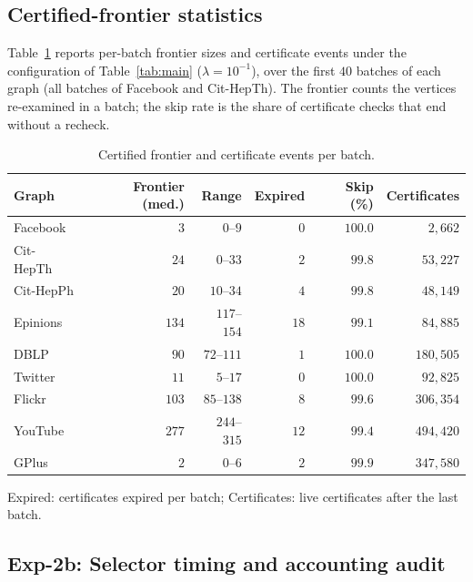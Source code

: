 \subsection{Certified-frontier statistics}
\label{app:frontier}

Table~\ref{tab:frontier} reports per-batch frontier sizes and certificate
events under the configuration of Table~\ref{tab:main} ($\lambda=10^{-1}$),
over the first $40$ batches of each graph (all batches of Facebook and
Cit-HepTh). The frontier counts the vertices re-examined in a batch; the skip
rate is the share of certificate checks that end without a recheck.

\begin{table}[tb]\centering
\caption{Certified frontier and certificate events per batch.}
\label{tab:frontier}
\begin{footnotesize}
\setlength{\tabcolsep}{0.3em}
\begin{tabular*}{\linewidth}{@{\extracolsep{\fill}}lrrrrr@{}}
\toprule
Graph & Frontier (med.) & Range & Expired & Skip (\%) & Certificates \\
\midrule
Facebook  & $3$   & $0$--$9$     & $0$  & $100.0$ & $2{,}662$ \\
Cit-HepTh & $24$  & $0$--$33$    & $2$  & $99.8$  & $53{,}227$ \\
Cit-HepPh & $20$  & $10$--$34$   & $4$  & $99.8$  & $48{,}149$ \\
Epinions  & $134$ & $117$--$154$ & $18$ & $99.1$  & $84{,}885$ \\
DBLP      & $90$  & $72$--$111$  & $1$  & $100.0$ & $180{,}505$ \\
Twitter   & $11$  & $5$--$17$    & $0$  & $100.0$ & $92{,}825$ \\
Flickr    & $103$ & $85$--$138$  & $8$  & $99.6$  & $306{,}354$ \\
YouTube   & $277$ & $244$--$315$ & $12$ & $99.4$  & $494{,}420$ \\
GPlus     & $2$   & $0$--$6$     & $2$  & $99.9$  & $347{,}580$ \\
\bottomrule
\end{tabular*}
\par\smallskip\raggedright
Expired: certificates expired per batch; Certificates: live certificates after
the last batch.
\end{footnotesize}
\end{table}

\subsection{Exp-2b: Selector timing and accounting audit}
\label{app:defer-seltime}

